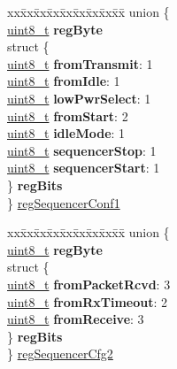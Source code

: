 \begin{DoxyCompactItemize}
\begin{tabbing}
\end{tabbing}\item 
\begin{tabbing}
xx\=xx\=xx\=xx\=xx\=xx\=xx\=xx\=xx\=\kill
union \{\\
\>\hyperlink{vl53l0x__types_8h_aba7bc1797add20fe3efdf37ced1182c5}{uint8\_t} {\bfseries regByte}\\
\>struct \{\\
\>\>\hyperlink{vl53l0x__types_8h_aba7bc1797add20fe3efdf37ced1182c5}{uint8\_t} {\bfseries fromTransmit}: 1\\
\>\>\hyperlink{vl53l0x__types_8h_aba7bc1797add20fe3efdf37ced1182c5}{uint8\_t} {\bfseries fromIdle}: 1\\
\>\>\hyperlink{vl53l0x__types_8h_aba7bc1797add20fe3efdf37ced1182c5}{uint8\_t} {\bfseries lowPwrSelect}: 1\\
\>\>\hyperlink{vl53l0x__types_8h_aba7bc1797add20fe3efdf37ced1182c5}{uint8\_t} {\bfseries fromStart}: 2\\
\>\>\hyperlink{vl53l0x__types_8h_aba7bc1797add20fe3efdf37ced1182c5}{uint8\_t} {\bfseries idleMode}: 1\\
\>\>\hyperlink{vl53l0x__types_8h_aba7bc1797add20fe3efdf37ced1182c5}{uint8\_t} {\bfseries sequencerStop}: 1\\
\>\>\hyperlink{vl53l0x__types_8h_aba7bc1797add20fe3efdf37ced1182c5}{uint8\_t} {\bfseries sequencerStart}: 1\\
\>\} {\bfseries regBits}\\
\} \hyperlink{structFSK__Register__Map_ae90eb7c7055eab661ab05b8d8b8b1226}{regSequencerConf1}\\

\end{tabbing}\item 
\begin{tabbing}
xx\=xx\=xx\=xx\=xx\=xx\=xx\=xx\=xx\=\kill
union \{\\
\>\hyperlink{vl53l0x__types_8h_aba7bc1797add20fe3efdf37ced1182c5}{uint8\_t} {\bfseries regByte}\\
\>struct \{\\
\>\>\hyperlink{vl53l0x__types_8h_aba7bc1797add20fe3efdf37ced1182c5}{uint8\_t} {\bfseries fromPacketRcvd}: 3\\
\>\>\hyperlink{vl53l0x__types_8h_aba7bc1797add20fe3efdf37ced1182c5}{uint8\_t} {\bfseries fromRxTimeout}: 2\\
\>\>\hyperlink{vl53l0x__types_8h_aba7bc1797add20fe3efdf37ced1182c5}{uint8\_t} {\bfseries fromReceive}: 3\\
\>\} {\bfseries regBits}\\
\} \hyperlink{structFSK__Register__Map_a4f7376428f494fcc98e59d5c6b4454a8}{regSequencerCfg2}\\


\end{tabbing}
\end{DoxyCompactItemize}
